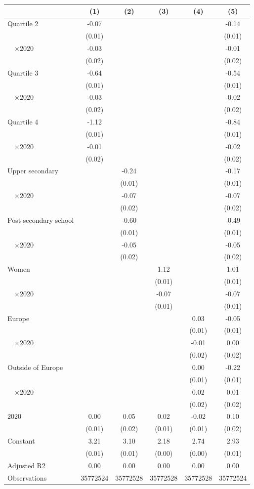 
\begin{tabular}{@{}l*{5}{S[table-format={-}2.2{\tnote{***}}]}@{}}
\toprule
{} & {(1)} & {(2)} & {(3)} & {(4)} & {(5)}\tabularnewline%
\midrule
Quartile 2 & -0.07\tnote{***} &  &  &  & -0.14\tnote{***}\tabularnewline%
 & (0.01) &  &  &  & \vphantom{2} (0.01)\tabularnewline%
~~\(\times 2020\) & -0.03 &  &  &  & -0.01\tabularnewline%
 & (0.02) &  &  &  & \vphantom{2} (0.02)\tabularnewline%
Quartile 3 & -0.64\tnote{***} &  &  &  & -0.54\tnote{***}\tabularnewline%
 & (0.01) &  &  &  & \vphantom{1} (0.01)\tabularnewline%
~~\(\times 2020\) & -0.03 &  &  &  & -0.02\tabularnewline%
 & (0.02) &  &  &  & \vphantom{1} (0.02)\tabularnewline%
Quartile 4 & -1.12\tnote{***} &  &  &  & -0.84\tnote{***}\tabularnewline%
 & (0.01) &  &  &  & (0.01)\tabularnewline%
~~\(\times 2020\) & -0.01 &  &  &  & -0.02\tabularnewline%
 & (0.02) &  &  &  & (0.02)\tabularnewline%
Upper secondary &  & -0.24\tnote{***} &  &  & -0.17\tnote{***}\tabularnewline%
 &  & (0.01) &  &  & \vphantom{1} (0.01)\tabularnewline%
~~\(\times 2020\) &  & -0.07\tnote{***} &  &  & -0.07\tnote{***}\tabularnewline%
 &  & (0.02) &  &  & \vphantom{1} (0.02)\tabularnewline%
Post-secondary school &  & -0.60\tnote{***} &  &  & -0.49\tnote{***}\tabularnewline%
 &  & (0.01) &  &  & (0.01)\tabularnewline%
~~\(\times 2020\) &  & -0.05\tnote{*} &  &  & -0.05\tnote{*}\tabularnewline%
 &  & (0.02) &  &  & (0.02)\tabularnewline%
Women &  &  & 1.12\tnote{***} &  & 1.01\tnote{***}\tabularnewline%
 &  &  & (0.01) &  & \vphantom{1} (0.01)\tabularnewline%
~~\(\times 2020\) &  &  & -0.07\tnote{***} &  & -0.07\tnote{***}\tabularnewline%
 &  &  & (0.01) &  & (0.01)\tabularnewline%
Europe &  &  &  & 0.03\tnote{**} & -0.05\tnote{***}\tabularnewline%
 &  &  &  & (0.01) & \vphantom{1} (0.01)\tabularnewline%
~~\(\times 2020\) &  &  &  & -0.01 & 0.00\tabularnewline%
 &  &  &  & (0.02) & \vphantom{1} (0.02)\tabularnewline%
Outside of Europe &  &  &  & 0.00 & -0.22\tnote{***}\tabularnewline%
 &  &  &  & (0.01) & (0.01)\tabularnewline%
~~\(\times 2020\) &  &  &  & 0.02 & 0.01\tabularnewline%
 &  &  &  & (0.02) & (0.02)\tabularnewline%
\midrule
\(2020\) & 0.00 & 0.05\tnote{*} & 0.02\tnote{**} & -0.02\tnote{*} & 0.10\tnote{***}\tabularnewline%
 & (0.01) & (0.02) & (0.01) & (0.01) & (0.02)\tabularnewline%
Constant & 3.21\tnote{***} & 3.10\tnote{***} & 2.18\tnote{***} & 2.74\tnote{***} & 2.93\tnote{***}\tabularnewline%
 & (0.01) & (0.01) & (0.00) & (0.00) & (0.01)\tabularnewline%
\midrule
Adjusted R2 & 0.00 & 0.00 & 0.00 & 0.00 & 0.00\tabularnewline%
Observations & {\num{35772524}} & {\num{35772528}} & {\num{35772528}} & {\num{35772528}} & {\num{35772524}}\tabularnewline%
\bottomrule
\end{tabular}
